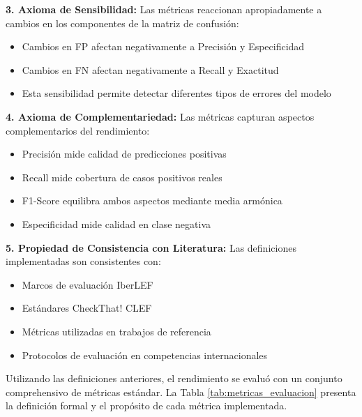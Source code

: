 \textbf{3. Axioma de Sensibilidad:}
Las métricas reaccionan apropiadamente a cambios en los componentes de la matriz de confusión:
\begin{itemize}
    \item Cambios en FP afectan negativamente a Precisión y Especificidad
    \item Cambios en FN afectan negativamente a Recall y Exactitud
    \item Esta sensibilidad permite detectar diferentes tipos de errores del modelo
\end{itemize}

\textbf{4. Axioma de Complementariedad:}
Las métricas capturan aspectos complementarios del rendimiento:
\begin{itemize}
    \item Precisión mide calidad de predicciones positivas
    \item Recall mide cobertura de casos positivos reales
    \item F1-Score equilibra ambos aspectos mediante media armónica
    \item Especificidad mide calidad en clase negativa
\end{itemize}

\textbf{5. Propiedad de Consistencia con Literatura:}
Las definiciones implementadas son consistentes con:
\begin{itemize}
    \item Marcos de evaluación IberLEF \cite{aragon2020overview}
    \item Estándares CheckThat! CLEF \cite{barron2023clef}
    \item Métricas utilizadas en trabajos de referencia \cite{posadas2019detection, blanco2024enhancing}
    \item Protocolos de evaluación en competencias internacionales
\end{itemize}

Utilizando las definiciones anteriores, el rendimiento se evaluó con un conjunto comprehensivo de métricas estándar. La Tabla \ref{tab:metricas_evaluacion} presenta la definición formal y el propósito de cada métrica implementada.

